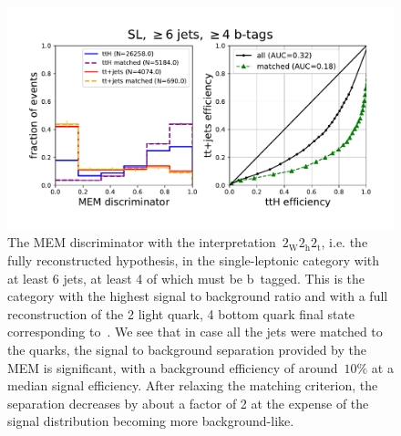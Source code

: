 \begin{figure}
\begin{centering}
\includegraphics[width = 1.0\textwidth]{figures/mem_sl_jge6_tge4.pdf}
\caption[The MEM discriminator with the~$2_{\mathrm{W}} 2_{\mathrm{h}} 2_{\mathrm{t}}$ interpretation in the $\ge6$ jet, $\ge4$ b-tag category]{The MEM discriminator with the interpretation~$2_{\mathrm{W}} 2_{\mathrm{h}} 2_{\mathrm{t}}$, i.e. the fully reconstructed hypothesis, in the single-leptonic category with at least 6 jets, at least 4 of which must be b~tagged. This is the category with the highest signal to background ratio and with a full reconstruction of the 2 light quark, 4 bottom quark final state corresponding to~\ttHbb. We see that in case all the jets were matched to the quarks, the signal to background separation provided by the MEM is significant, with a background efficiency of around~$10\%$ at a median signal efficiency. After relaxing the matching criterion, the separation decreases by about a factor of 2 at the expense of the signal distribution becoming more background-like.}
\label{fig:mem_sl_jge6_tge4}
\end{centering}
\end{figure}

